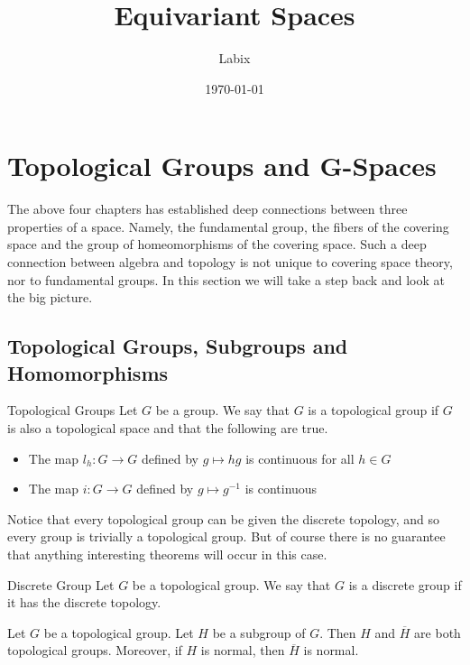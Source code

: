 \documentclass[a4paper]{article}
\title{Equivariant Spaces}
\author{Labix}
\date{\today}
\begin{document}
\maketitle
\begin{abstract}
\end{abstract}

\pagebreak
\tableofcontents
\pagebreak

\pagebreak
\section{Topological Groups and G-Spaces}
The above four chapters has established deep connections between three properties of a space. Namely, the fundamental group, the fibers of the covering space and the group of homeomorphisms of the covering space. Such a deep connection between algebra and topology is not unique to covering space theory, nor to fundamental groups. In this section we will take a step back and look at the big picture. 

\subsection{Topological Groups, Subgroups and Homomorphisms}
\begin{defn}{Topological Groups}{} Let $G$ be a group. We say that $G$ is a topological group if $G$ is also a topological space and that the following are true. 
\begin{itemize}
\item The map $l_h:G\to G$ defined by $g\mapsto hg$ is continuous for all $h\in G$
\item The map $i:G\to G$ defined by $g\mapsto g^{-1}$ is continuous
\end{itemize}
\end{defn}

Notice that every topological group can be given the discrete topology, and so every group is trivially a topological group. But of course there is no guarantee that anything interesting theorems will occur in this case. 

\begin{defn}{Discrete Group}{} Let $G$ be a topological group. We say that $G$ is a discrete group if it has the discrete topology. 
\end{defn}

\begin{prp}{}{} Let $G$ be a topological group. Let $H$ be a subgroup of $G$. Then $H$ and $\overline{H}$ are both topological groups. Moreover, if $H$ is normal, then $\overline{H}$ is normal. 
\end{prp}
\end{document}
